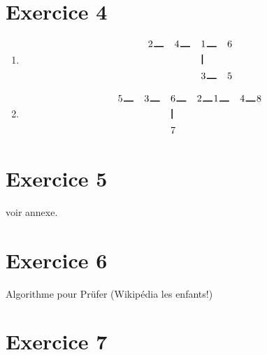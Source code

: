 \documentclass{article}
\begin{document}
\section*{Exercice 4}
\begin{enumerate}
\item 
\begin{alignat*}{10}
&2 \hspace{1pt}\rule{10pt}{1pt} \hspace{1pt}&&4\hspace{1pt}\rule{10pt}{1pt} \hspace{1pt}&&1\hspace{1pt}\rule{10pt}{1pt}\hspace{1pt} &6\\
& && &&\hspace{1pt}\rule{1pt}{10pt} &\\
& && &&3 \hspace{1pt}\rule{10pt}{1pt} &5
\end{alignat*}
\item
\begin{alignat*}{10}
&5 \hspace{1pt}\rule{10pt}{1pt} \hspace{1pt}&&3 \hspace{1pt}\rule{10pt}{1pt} \hspace{1pt}&&6 \hspace{1pt}\rule{10pt}{1pt}\hspace{1pt} &2\hspace{1pt}\rule{10pt}{1pt}\hspace{1pt} &1 \hspace{1pt}\rule{10pt}{1pt}\hspace{1pt} &4 \hspace{1pt}\rule{10pt}{1pt}\hspace{1pt} &8\\
& && &&\hspace{1pt}\rule{1pt}{10pt} &\\
& && &&7
\end{alignat*}
\end{enumerate}

\section*{Exercice 5}
voir annexe.

\section*{Exercice 6}
Algorithme pour Prüfer (Wikipédia les enfants!)

\section*{Exercice 7}
\end{document}

